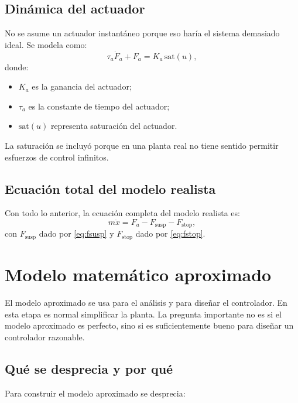 \documentclass[11pt]{article}
\begin{document}
\subsection{Din\'amica del actuador}

No se asume un actuador instant\'aneo porque eso har\'ia el sistema demasiado ideal. Se modela como:
\begin{equation}
\tau_a \dot{F}_a + F_a = K_a\,\text{sat}(u),
\label{eq:act}
\end{equation}
donde:

\begin{itemize}[leftmargin=1.2cm]
\item $K_a$ es la ganancia del actuador;
\item $\tau_a$ es la constante de tiempo del actuador;
\item $\text{sat}(u)$ representa saturaci\'on del actuador.
\end{itemize}

La saturaci\'on se incluy\'o porque en una planta real no tiene sentido permitir esfuerzos de control infinitos.

\subsection{Ecuaci\'on total del modelo realista}

Con todo lo anterior, la ecuaci\'on completa del modelo realista es:
\begin{equation}
m\ddot{x} = F_a - F_{\text{susp}} - F_{\text{stop}},
\label{eq:realista}
\end{equation}
con $F_{\text{susp}}$ dado por \eqref{eq:fsusp} y $F_{\text{stop}}$ dado por \eqref{eq:fstop}.

\section{Modelo matem\'atico aproximado}

El modelo aproximado se usa para el an\'alisis y para dise\~nar el controlador. En esta etapa es normal simplificar la planta. La pregunta importante no es si el modelo aproximado es perfecto, sino si es suficientemente bueno para dise\~nar un controlador razonable.

\subsection{Qu\'e se desprecia y por qu\'e}

Para construir el modelo aproximado se desprecia:
\end{document}
